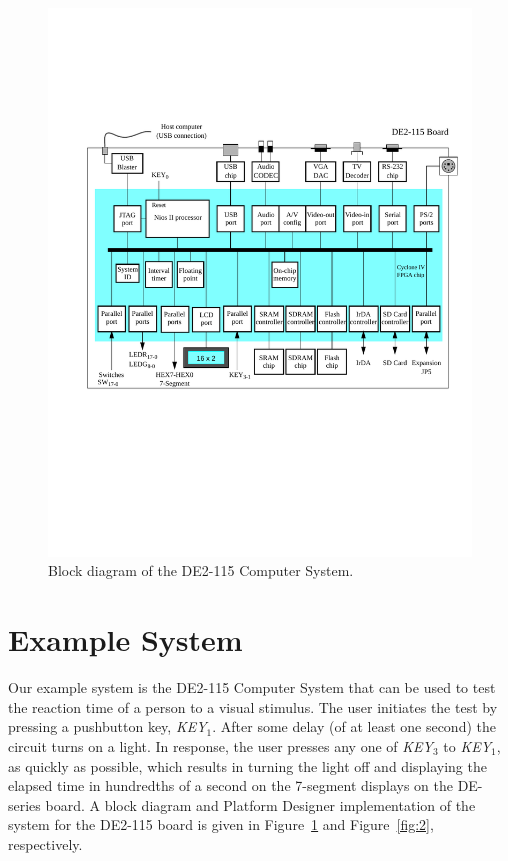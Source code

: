 \documentclass[11pt, twoside, pdftex]{article}
\begin{document}
\begin{figure}[h!]
   \begin{center}
        \includegraphics[scale=0.80]{figures/fig_block_diagram.pdf}
   \end{center}
   \caption{Block diagram of the DE2-115 Computer System.}
	\label{fig:1}
\end{figure}

\section{Example System}
Our example system is the DE2-115 Computer System that can be used to test the reaction time of a person
to a visual stimulus. The user initiates the test by pressing a pushbutton key, 
{\it KEY}$_1$. After some delay (of at least one second) the circuit turns on a light. 
In response, the user presses any one of {\it KEY}$_3$ to {\it KEY}$_1$, as quickly as possible, which 
results in turning the light off and displaying the elapsed time in
hundredths of a second on the 7-segment displays 
on the DE-series board. A block diagram and Platform Designer implementation of the system for the DE2-115 board is given in Figure~\ref{fig:1} and Figure~\ref{fig:2}, respectively.
\end{document}
